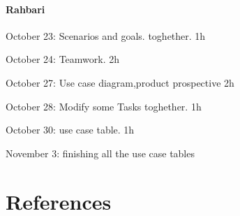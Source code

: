 \documentclass{article}
\begin{document}
	\paragraph{Rahbari}
		\begin{list}{-}{}
			\item October 23: Scenarios and goals. toghether. 1h
			\item October 24: Teamwork. 2h
			\item October 27: Use case diagram,product prospective 2h
			\item October 28: Modify some Tasks toghether. 1h
			\item October 30: use case table. 1h
			\item November 3: finishing all the use case tables
		\end{list}
\section{References}
\end{document}
